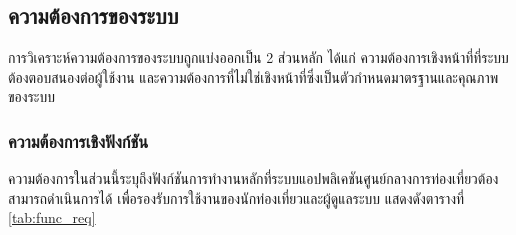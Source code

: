 \subsection{ความต้องการของระบบ}

การวิเคราะห์ความต้องการของระบบถูกแบ่งออกเป็น 2 ส่วนหลัก ได้แก่ ความต้องการเชิงหน้าที่ที่ระบบต้องตอบสนองต่อผู้ใช้งาน และความต้องการที่ไม่ใช่เชิงหน้าที่ซึ่งเป็นตัวกำหนดมาตรฐานและคุณภาพของระบบ

\subsubsection{ความต้องการเชิงฟังก์ชัน}

ความต้องการในส่วนนี้ระบุถึงฟังก์ชันการทำงานหลักที่ระบบแอปพลิเคชันศูนย์กลางการท่องเที่ยวต้องสามารถดำเนินการได้ เพื่อรองรับการใช้งานของนักท่องเที่ยวและผู้ดูแลระบบ แสดงดังตารางที่ \ref{tab:func_req}

